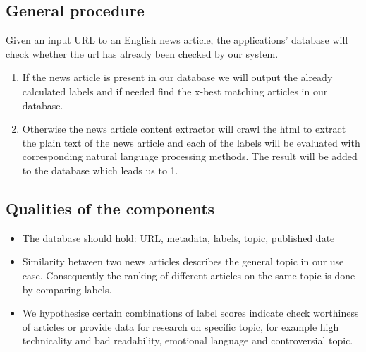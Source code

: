 \documentclass[10pt]{article}
\begin{document}
\subsection{General procedure}
Given an input URL to an English news article, the applications' database will check whether the url has already been checked by our system.
\begin{enumerate}
\item If the news article is present in our database we will output the already calculated labels and if needed find the x-best matching articles in our database.
\item Otherwise the news article content extractor will crawl the html to extract the plain text of the news article and each of the labels will be evaluated with corresponding natural language processing methods. The result will be added to the database which leads us to 1.
\end{enumerate}

\subsection{Qualities of the components}
\begin{itemize}
\item The database should hold: URL, metadata, labels, topic, published date
\item Similarity between two news articles describes the general topic in our use case. Consequently the ranking of different articles on the same topic is done by comparing labels.
\item We hypothesise certain combinations of label scores indicate check worthiness of articles or provide data for research on specific topic, for example high technicality and bad readability, emotional language and controversial topic.
\end{itemize}
\end{document}
